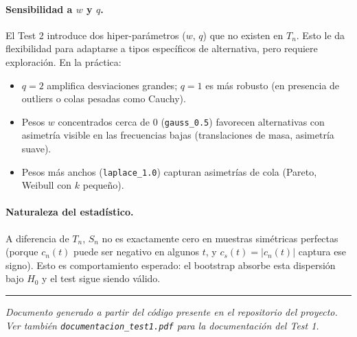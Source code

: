 \documentclass[11pt,a4paper]{article}
\begin{document}
\paragraph{Sensibilidad a $w$ y $q$.} El Test 2 introduce dos hiper-parámetros
($w$, $q$) que no existen en $T_n$. Esto le da flexibilidad para
adaptarse a tipos específicos de alternativa, pero requiere
exploración. En la práctica:
\begin{itemize}[leftmargin=*]
    \item $q=2$ amplifica desviaciones grandes; $q=1$ es más robusto
    (en presencia de outliers o colas pesadas como Cauchy).
    \item Pesos $w$ concentrados cerca de 0 (\texttt{gauss\_0.5}) favorecen
    alternativas con asimetría visible en las frecuencias bajas
    (translaciones de masa, asimetría suave).
    \item Pesos más anchos (\texttt{laplace\_1.0}) capturan asimetrías de
    cola (Pareto, Weibull con $k$ pequeño).
\end{itemize}

\paragraph{Naturaleza del estadístico.} A diferencia de $T_n$, $S_n$ no
es exactamente cero en muestras simétricas perfectas (porque
$c_n(t)$ puede ser negativo en algunos $t$, y $c_s(t)=|c_n(t)|$
captura ese signo). Esto es comportamiento esperado: el bootstrap
absorbe esta dispersión bajo $H_0$ y el test sigue siendo válido.

\vspace{1em}
\hrule
\vspace{0.5em}
\begin{center}\small\itshape
Documento generado a partir del código presente en el repositorio del proyecto.\\
Ver también \texttt{documentacion\_test1.pdf} para la documentación del Test 1.
\end{center}
\end{document}
